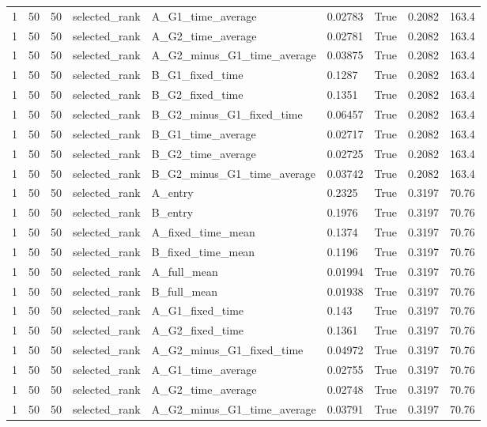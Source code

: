 \begin{longtable}{lllllllll}
1 & 50 & 50 & selected\_rank & A\_G1\_time\_average & 0.02783 & True & 0.2082 & 163.4 \\
1 & 50 & 50 & selected\_rank & A\_G2\_time\_average & 0.02781 & True & 0.2082 & 163.4 \\
1 & 50 & 50 & selected\_rank & A\_G2\_minus\_G1\_time\_average & 0.03875 & True & 0.2082 & 163.4 \\
1 & 50 & 50 & selected\_rank & B\_G1\_fixed\_time & 0.1287 & True & 0.2082 & 163.4 \\
1 & 50 & 50 & selected\_rank & B\_G2\_fixed\_time & 0.1351 & True & 0.2082 & 163.4 \\
1 & 50 & 50 & selected\_rank & B\_G2\_minus\_G1\_fixed\_time & 0.06457 & True & 0.2082 & 163.4 \\
1 & 50 & 50 & selected\_rank & B\_G1\_time\_average & 0.02717 & True & 0.2082 & 163.4 \\
1 & 50 & 50 & selected\_rank & B\_G2\_time\_average & 0.02725 & True & 0.2082 & 163.4 \\
1 & 50 & 50 & selected\_rank & B\_G2\_minus\_G1\_time\_average & 0.03742 & True & 0.2082 & 163.4 \\
1 & 50 & 50 & selected\_rank & A\_entry & 0.2325 & True & 0.3197 & 70.76 \\
1 & 50 & 50 & selected\_rank & B\_entry & 0.1976 & True & 0.3197 & 70.76 \\
1 & 50 & 50 & selected\_rank & A\_fixed\_time\_mean & 0.1374 & True & 0.3197 & 70.76 \\
1 & 50 & 50 & selected\_rank & B\_fixed\_time\_mean & 0.1196 & True & 0.3197 & 70.76 \\
1 & 50 & 50 & selected\_rank & A\_full\_mean & 0.01994 & True & 0.3197 & 70.76 \\
1 & 50 & 50 & selected\_rank & B\_full\_mean & 0.01938 & True & 0.3197 & 70.76 \\
1 & 50 & 50 & selected\_rank & A\_G1\_fixed\_time & 0.143 & True & 0.3197 & 70.76 \\
1 & 50 & 50 & selected\_rank & A\_G2\_fixed\_time & 0.1361 & True & 0.3197 & 70.76 \\
1 & 50 & 50 & selected\_rank & A\_G2\_minus\_G1\_fixed\_time & 0.04972 & True & 0.3197 & 70.76 \\
1 & 50 & 50 & selected\_rank & A\_G1\_time\_average & 0.02755 & True & 0.3197 & 70.76 \\
1 & 50 & 50 & selected\_rank & A\_G2\_time\_average & 0.02748 & True & 0.3197 & 70.76 \\
1 & 50 & 50 & selected\_rank & A\_G2\_minus\_G1\_time\_average & 0.03791 & True & 0.3197 & 70.76 \\

\end{longtable}
